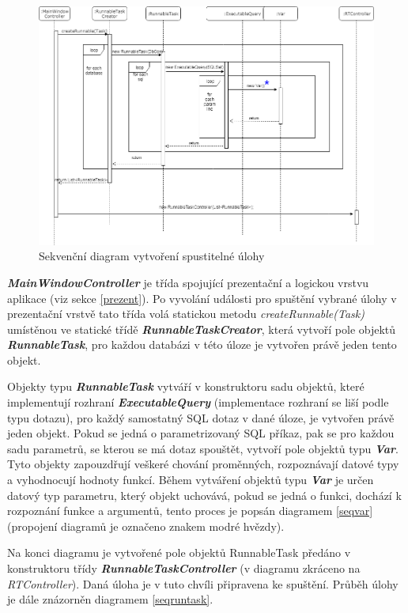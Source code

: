 \documentclass[czech,bachelor,public,dept460,male,cpdeclaration,twoside]{diploma}
\begin{document}
\begin{figure}[!htbp]\centering\includegraphics[width=1.0\textwidth]{Figures/rtprocess.png}\caption{Sekvenční diagram vytvoření spustitelné úlohy}
\label{seq1}
\end{figure}

\textbf{\emph{MainWindowController}} je třída spojující prezentační a logickou vrstvu aplikace (viz sekce \ref{prezent}). Po vyvolání události pro spuštění vybrané úlohy v prezentační vrstvě tato třída volá statickou metodu \textit{createRunnable(Task)} umístěnou ve statické třídě \textbf{\emph{RunnableTaskCreator}}, která vytvoří pole objektů \textbf{\emph{RunnableTask}}, pro každou databázi v této úloze je vytvořen právě jeden tento objekt.

Objekty typu \textbf{\emph{RunnableTask}} vytváří v konstruktoru sadu objektů, které implementují rozhraní \textbf{\emph{ExecutableQuery}} (implementace rozhraní se liší podle typu dotazu), pro každý samostatný SQL dotaz v dané úloze, je vytvořen právě jeden objekt. Pokud se jedná o parametrizovaný SQL příkaz, pak se pro každou sadu parametrů, se kterou se má dotaz spouštět, vytvoří pole objektů typu \textbf{\emph{Var}}. Tyto objekty zapouzdřují veškeré chování proměnných, rozpoznávají datové typy a vyhodnocují hodnoty funkcí. Během vytváření objektů typu \textbf{\emph{Var}} je určen datový typ parametru, který objekt uchovává, pokud se jedná o funkci, dochází k rozpoznání funkce a argumentů, tento proces je popsán diagramem \ref{seqvar} (propojení diagramů je označeno znakem modré hvězdy).


Na konci diagramu je vytvořené pole objektů RunnableTask předáno v konstruktoru třídy  \textbf{\emph{RunnableTaskController}} (v diagramu zkráceno na \textit{RTController}). Daná úloha je v tuto chvíli připravena ke spuštění. Průběh úlohy je dále znázorněn diagramem \ref{seqruntask}.
\end{document}
